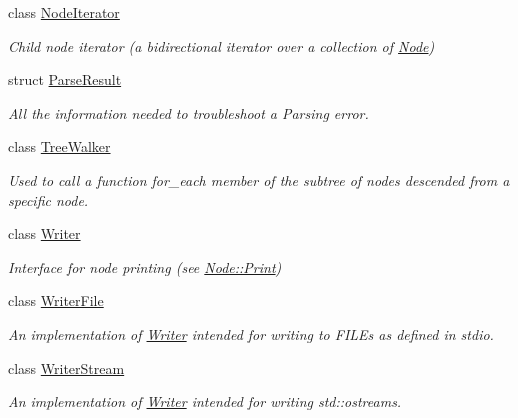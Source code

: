 \begin{DoxyCompactItemize}
class \hyperlink{classphys_1_1xml_1_1NodeIterator}{NodeIterator}
\begin{DoxyCompactList}\small\item\em Child node iterator (a bidirectional iterator over a collection of \hyperlink{classphys_1_1xml_1_1Node}{Node}) \item\end{DoxyCompactList}\item 
struct \hyperlink{structphys_1_1xml_1_1ParseResult}{ParseResult}
\begin{DoxyCompactList}\small\item\em All the information needed to troubleshoot a Parsing error. \item\end{DoxyCompactList}\item 
class \hyperlink{classphys_1_1xml_1_1TreeWalker}{TreeWalker}
\begin{DoxyCompactList}\small\item\em Used to call a function for\_\-each member of the subtree of nodes descended from a specific node. \item\end{DoxyCompactList}\item 
class \hyperlink{classphys_1_1xml_1_1Writer}{Writer}
\begin{DoxyCompactList}\small\item\em Interface for node printing (see \hyperlink{classphys_1_1xml_1_1Node_adbe10968a804a94552e1dc8223744406}{Node::Print}) \item\end{DoxyCompactList}\item 
class \hyperlink{classphys_1_1xml_1_1WriterFile}{WriterFile}
\begin{DoxyCompactList}\small\item\em An implementation of \hyperlink{classphys_1_1xml_1_1Writer}{Writer} intended for writing to FILEs as defined in stdio. \item\end{DoxyCompactList}\item 
class \hyperlink{classphys_1_1xml_1_1WriterStream}{WriterStream}
\begin{DoxyCompactList}\small\item\em An implementation of \hyperlink{classphys_1_1xml_1_1Writer}{Writer} intended for writing std::ostreams. \item\end{DoxyCompactList}\item 

\end{DoxyCompactItemize}
